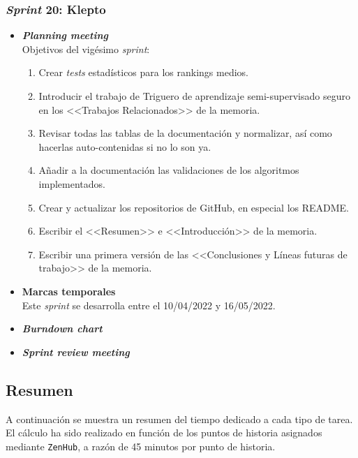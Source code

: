\subsubsection{\textit{Sprint} 20: Klepto}
\begin{itemize}
\item \textbf{\textit{Planning meeting}}\\
Objetivos del vigésimo \textit{sprint}:
\begin{enumerate}
\item Crear \textit{tests} estadísticos para los rankings medios.
\item Introducir el trabajo de Triguero de aprendizaje semi-supervisado seguro~\cite{triguero2014characterization} en los <<Trabajos Relacionados>> de la memoria.
\item Revisar todas las tablas de la documentación y normalizar, así como hacerlas auto-contenidas si no lo son ya.
\item Añadir a la documentación las validaciones de los algoritmos implementados.
\item Crear y actualizar los repositorios de GitHub, en especial los README.
\item Escribir el <<Resumen>> e <<Introducción>> de la memoria.
\item Escribir una primera versión de las <<Conclusiones y Líneas futuras de trabajo>> de la memoria.
\end{enumerate}

\item \textbf{Marcas temporales}\\
Este \textit{sprint} se desarrolla entre el 10/04/2022 y 16/05/2022.

\item \textbf{\textit{Burndown chart}}\\

\item \textbf{\textit{Sprint review meeting}}\\

\end{itemize}

\subsection{Resumen}
A continuación se muestra un resumen del tiempo dedicado a cada tipo de tarea. El cálculo ha sido realizado en función de los puntos de historia asignados mediante \texttt{ZenHub}, a razón de 45 minutos por punto de historia.

